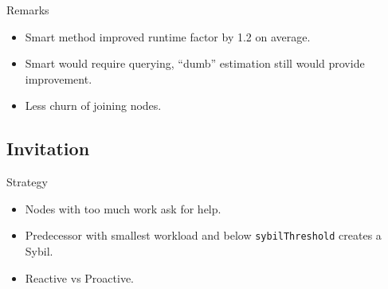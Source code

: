 \documentclass[11pt]{beamer}
\begin{document}
\begin{frame}{Remarks}
	\begin{itemize}
		\item Smart method improved runtime factor by 1.2 on average.
		\item Smart would require querying, ``dumb'' estimation still would provide improvement.
		\item Less churn of joining nodes.
	\end{itemize}
\end{frame}

\subsection{Invitation}
\begin{frame}{Strategy}
	\begin{itemize}
		\item Nodes with too much work ask for help.
		\item Predecessor with smallest workload and below \texttt{sybilThreshold} creates a Sybil.
		\item Reactive vs Proactive.
	\end{itemize}
\end{frame}

\end{document}
